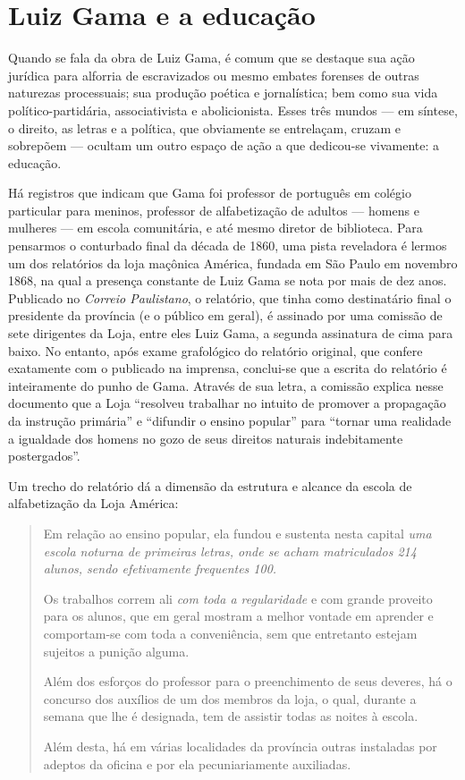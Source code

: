 \section{Luiz Gama e a educação}

Quando se fala da obra de Luiz Gama, é comum que se destaque sua ação
jurídica para alforria de escravizados ou mesmo embates forenses de
outras naturezas processuais; sua produção poética e jornalística; bem
como sua vida político-partidária, associativista e abolicionista. Esses
três mundos --- em síntese, o direito, as letras e a política, que
obviamente se entrelaçam, cruzam e sobrepõem --- ocultam um outro espaço
de ação a que dedicou-se vivamente: a educação.

Há registros que indicam que Gama foi professor de português em colégio
particular para meninos, professor de alfabetização de adultos --- homens
e mulheres --- em escola comunitária, e até mesmo diretor de biblioteca.
Para pensarmos o conturbado final da década de 1860, uma pista
reveladora é lermos um dos relatórios da loja maçônica América, fundada
em São Paulo em novembro 1868, na qual a presença constante
de Luiz Gama se nota por mais de dez anos. Publicado no \emph{Correio
Paulistano}, o relatório, que tinha como destinatário final o presidente
da província (e o público em geral), é assinado por uma comissão de sete
dirigentes da Loja, entre eles Luiz Gama, a segunda assinatura de cima
para baixo. No entanto, após exame grafológico do relatório original,
que confere exatamente com o publicado na imprensa, conclui-se que a
escrita do relatório é inteiramente do punho de Gama. Através de sua letra, a comissão explica nesse documento que a Loja ``resolveu
trabalhar no intuito de promover a propagação da instrução primária'' e
``difundir o ensino popular'' para ``tornar uma realidade a igualdade dos
homens no gozo de seus direitos naturais indebitamente postergados''.

Um trecho do relatório dá a dimensão da estrutura e alcance da escola de
alfabetização da Loja América:

\begin{quote}
Em relação ao ensino popular, ela fundou e sustenta nesta capital
\textit{uma escola noturna de primeiras letras, onde se acham
matriculados 214 alunos, sendo efetivamente frequentes 100.}

Os trabalhos correm ali \textit{com toda a regularidade} e com grande
proveito para os alunos, que em geral mostram a melhor vontade em
aprender e comportam-se com toda a conveniência, sem que entretanto
estejam sujeitos a punição alguma.

Além dos esforços do professor para o preenchimento de seus deveres, há
o concurso dos auxílios de um dos membros da loja, o qual, durante a
semana que lhe é designada, tem de assistir todas as noites à escola.

Além desta, há em várias localidades da província outras instaladas por
adeptos da oficina e por ela pecuniariamente auxiliadas.
\end{quote}

